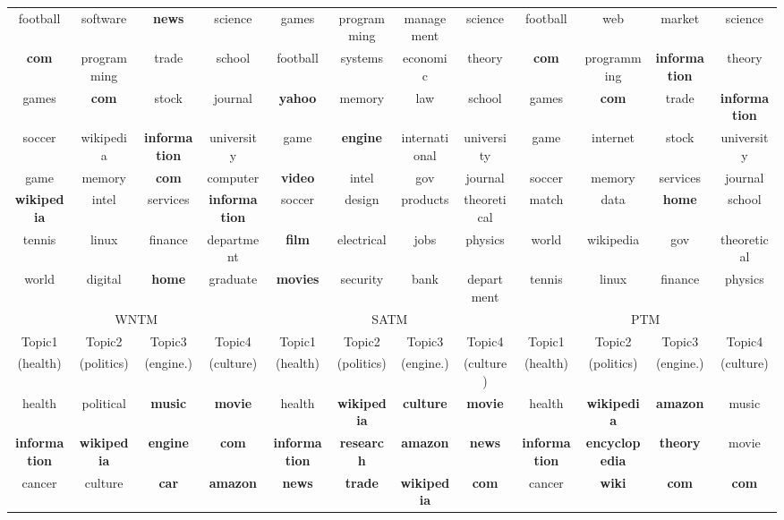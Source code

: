 \documentclass[10pt,journal,compsoc]{IEEEtran}
\begin{document}
{\begin{table}
{\begin{tabular}{|cccc|cccc|cccc|}
    {football}&{software}&\textbf{news}&{science}&{games}&{programming}&{management}&{science}&{football}&{web}&{market}&{science}\\
    \textbf{com}&{programming}&{trade}&{school}&{football}&{systems}&{economic}&{theory}&\textbf{com}&{programming}&\textbf{information}&{theory}\\
    {games}&\textbf{com}&{stock}&{journal}&{\textbf{yahoo}}&{memory}&{law}&{school}&{games}&\textbf{com}&{trade}&\textbf{information}\\
    {soccer}&{wikipedia}&\textbf{information}&{university}&{game}&\textbf{engine}&{international}&{university}&{game}&{internet}&{stock}&{university}\\
    {game}&{memory}&\textbf{com}&{computer}&{\textbf{video}}&{intel}&{gov}&{journal}&{soccer}&{memory}&{services}&{journal}\\
    {\textbf{wikipedia}}&{intel}&{services}&\textbf{information}&{soccer}&{design}&{products}&{theoretical}&{match}&{data}&{\textbf{home}}&{school}\\
    {tennis}&{linux}&{finance}&{department}&{\textbf{film}}&{electrical}&{jobs}&{physics}&{world}&{wikipedia}&{gov}&{theoretical}\\
    {world}&{digital}&{\textbf{home}}&{graduate}&{\textbf{movies}}&{security}&{bank}&{department}&{tennis}&{linux}&{finance}&{physics}\\
    \hline
    \multicolumn{4}{|c|}{WNTM}&\multicolumn{4}{|c|}{SATM}&\multicolumn{4}{|c|}{PTM}\\
    \hline
    {Topic1}&{Topic2}&{Topic3}&{Topic4}&{Topic1}&{Topic2}&{Topic3}&{Topic4}&{Topic1}&{Topic2}&{Topic3}&{Topic4}\\
    {(health)}&{(politics)}&{(engine.)}&{(culture)}&{(health)}&{(politics)}&{(engine.)}&{(culture)}&{(health)}&{(politics)}&{(engine.)}&{(culture)}\\
    \hline
    {health}&{political}&{\textbf{music}}&\textbf{movie}&{health}&{\textbf{wikipedia}}&{\textbf{culture}}&\textbf{movie}&{health}&{\textbf{wikipedia}}&{\textbf{amazon}}&{music}\\
    \textbf{information}&{\textbf{wikipedia}}&\textbf{engine}&\textbf{com}&\textbf{information}&\textbf{research}&{\textbf{amazon}}&\textbf{news}&\textbf{information}&{\textbf{encyclopedia}}&{\textbf{theory}}&{movie}\\
    {cancer}&{culture}&\textbf{car}&{\textbf{amazon}}&\textbf{news}&\textbf{trade}&{\textbf{wikipedia}}&\textbf{com}&{cancer}&{\textbf{wiki}}&{\textbf{com}}&\textbf{com}\\

\end{tabular}}
\end{table}}
\end{document}
